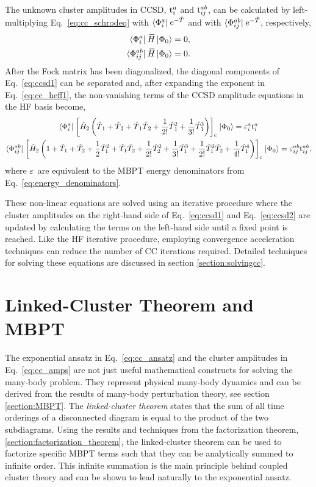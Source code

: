 \documentclass[thesis.tex]{subfiles}
\begin{document}
The unknown cluster amplitudes in CCSD, $\text{t}^{a}_{i}$ and $\text{t}^{ab}_{ij}$, can be calculated by left-multiplying Eq.\ \eqref{eq:cc_schrodeq} with $\langle \Phi^{a}_{i} |\hspace{1pt} \operatorname{e}^{-\hat{T}\hspace{-0.25pt}}$ and with $\langle \Phi^{ab}_{ij} |\hspace{1pt} \operatorname{e}^{-\hat{T}\hspace{-0.25pt}}$, respectively,
\begin{align} \label{eq:ccsd1}
  \statebra{a}{i} \EHam \refket &= 0, \notag \\
  \statebra{ab}{ij} \EHam \refket &= 0.
\end{align}
After the Fock matrix has been diagonalized, the diagonal components of Eq.\ \eqref{eq:ccsd1} can be separated and, after expanding the exponent in Eq.\ \eqref{eq:cc_heff1}, the non-vanishing terms of the CCSD amplitude equations in the HF basis become,
\begin{gather} \label{eq:ccsd2}
  \langle \Phi^{a}_{i} |\hspace{1pt} \left[ \hat{H}\hspace{-1pt}_{2} \left(\hat{T}\hspace{-0.25pt}_{1} + \hat{T}\hspace{-0.25pt}_{2} + \hat{T}\hspace{-0.25pt}_{1}\hat{T}\hspace{-0.25pt}_{2} + \frac{1}{2!} \hat{T}\hspace{-0.25pt}_{1}^{2} + \frac{1}{3!} \hat{T}\hspace{-0.25pt}_{1}^{3}\right) \right]_{\mathrm{c}} \hspace{1pt}\lvert \Phi_{0} \rangle = \varepsilon^{a}_{i}\text{t}^{a}_{i} \\
  \langle \Phi^{ab}_{ij} |\hspace{1pt} \left[ \hat{H}\hspace{-1pt}_{2} \left(1 + \hat{T}_1 + \hat{T}_2 + \frac{1}{2} \hat{T}_1^{2} + \hat{T}_1\hat{T}_2 + \frac{1}{2!} \hat{T}_2^{2} + \frac{1}{3!} \hat{T}_1^{3} + \frac{1}{2!} \hat{T}_1^{2} \hat{T}_2 + \frac{1}{4!} \hat{T}_1^{4}\right) \right]_{\mathrm{c}} \hspace{1pt}\lvert \Phi_{0} \rangle = \varepsilon^{ab}_{ij}\text{t}^{ab}_{ij}, \notag
\end{gather}
where $\varepsilon^{}_{}$ are equivalent to the MBPT energy denominators from Eq.\ \eqref{eq:energy_denominators}.

These non-linear equations are solved using an iterative procedure where the cluster amplitudes on the right-hand side of Eq.\ \eqref{eq:ccsd1} and Eq.\ \eqref{eq:ccsd2} are updated by calculating the terms on the left-hand side until a fixed point is reached.  Like the HF iterative procedure, employing convergence acceleration techniques can reduce the number of CC iterations required.  Detailed techniques for solving these equations are discussed in section \ref{section:solvingcc}.


\section{Linked-Cluster Theorem and MBPT} \label{section:linkedcluster}

The exponential ansatz in Eq.\ \eqref{eq:cc_ansatz} and the cluster amplitudes in Eq.\ \eqref{eq:cc_amps} are not just useful mathematical constructs for solving the many-body problem. They represent physical many-body dynamics and can be derived from the results of many-body perturbation theory, see section \ref{section:MBPT}.  The \textit{linked-cluster theorem} \cite{HUGENHOLTZ1957481,FRANTZ196016,BRANDOW1967} states that the sum of all time orderings of a disconnected diagram is equal to the product of the two subdiagrams.  Using the results and techniques from the factorization theorem, \ref{section:factorization_theorem}, the linked-cluster theorem can be used to factorize specific MBPT terms such that they can be analytically summed to infinite order.  This infinite summation is the main principle behind coupled cluster theory and can be shown to lead naturally to the exponential ansatz.
\end{document}
